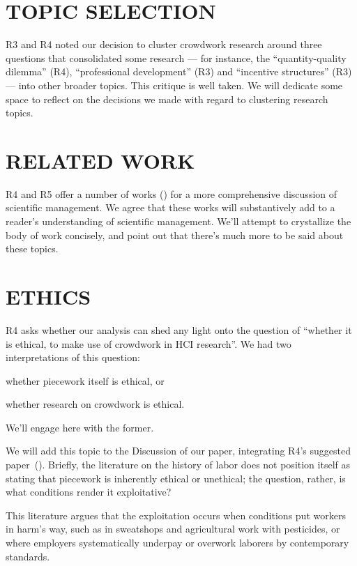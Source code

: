 \documentclass[11pt]{article}
\begin{document}
\section*{TOPIC SELECTION}
R3 and R4 noted our decision to cluster crowdwork research around three questions
that consolidated some research
--- for instance, the ``quantity-quality dilemma'' (R4), ``professional development'' (R3) and ``incentive structures'' (R3) --- into other broader topics.
This critique is well taken. We will dedicate some space to reflect on
the decisions we made with regard to clustering research topics.

\section*{RELATED WORK}
R4 and R5 offer a number of works
(\cite[e.g.][]{williamson2016})
for a more comprehensive discussion of scientific management.
We agree that these works will
substantively add to a reader's understanding of scientific management.
We'll attempt to crystallize the body of work concisely, and
point out that there's much more to be said about these topics.

\section*{ETHICS}
R4 asks whether our analysis can shed any light onto the question of
``whether it is ethical, to make use of crowdwork in HCI research''.
We had two interpretations of this question:
\begin{inlinelist}
  \item whether piecework itself is ethical, or
  \item whether research on crowdwork is ethical. 
\end{inlinelist}
We'll engage here with the former.

We will add this topic to the Discussion of our paper,
integrating R4's suggested paper~(\cite[namely,][]{williamson2016}).
Briefly, the literature on the history of labor does not
position itself as stating that piecework is inherently ethical or unethical;
the question, rather, is what conditions render it exploitative?

This literature argues that the exploitation occurs when
conditions put workers in harm's way, such as
in sweatshops and agricultural work with pesticides, or where
employers systematically underpay or overwork laborers by contemporary standards.
\end{document}
